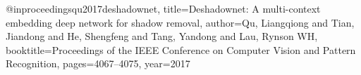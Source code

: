 @inproceedings{qu2017deshadownet,
  title={Deshadownet: A multi-context embedding deep network for shadow removal},
  author={Qu, Liangqiong and Tian, Jiandong and He, Shengfeng and Tang, Yandong and Lau, Rynson WH},
  booktitle={Proceedings of the IEEE Conference on Computer Vision and Pattern Recognition},
  pages={4067--4075},
  year={2017}
}